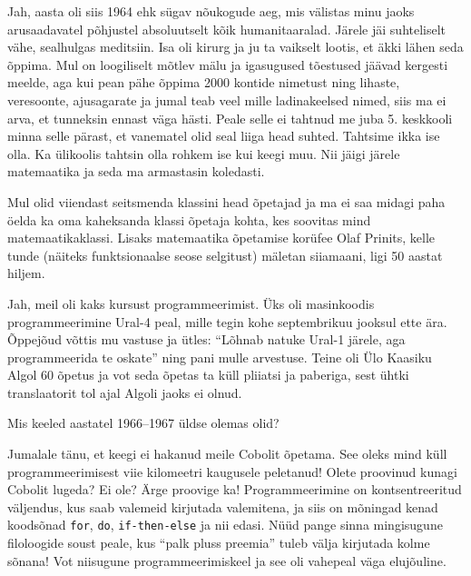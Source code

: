 
Jah, aasta oli siis 1964 ehk sügav nõukogude aeg, mis välistas minu jaoks arusaadavatel 
põhjustel absoluutselt kõik humanitaaralad. Järele jäi suhteliselt vähe, sealhulgas meditsiin. Isa oli kirurg ja ju ta 
vaikselt lootis, et äkki lähen seda õppima. Mul on loogiliselt mõtlev mälu ja 
igasugused tõestused jäävad kergesti meelde, aga kui pean 
pähe õppima 2000 kontide nimetust ning lihaste, veresoonte, 
ajusagarate ja jumal teab veel mille ladinakeelsed nimed, siis ma ei 
arva, et tunneksin ennast väga hästi. Peale selle ei tahtnud me juba 5. keskkooli 
minna selle pärast, et vanematel olid seal liiga head suhted. 
Tahtsime ikka ise olla. Ka ülikoolis tahtsin olla rohkem ise kui keegi muu. 
Nii jäigi järele matemaatika ja seda ma armastasin koledasti. 

Mul olid viiendast seitsmenda klassini head õpetajad ja ma ei saa midagi 
paha öelda ka oma kaheksanda klassi õpetaja kohta, kes soovitas mind matemaatikaklassi. Lisaks matemaatika õpetamise korüfee Olaf 
Prinits, kelle tunde (näiteks funktsionaalse seose selgitust) mäletan siiamaani, ligi 50 aastat hiljem. 


Jah, meil oli kaks kursust programmeerimist. Üks oli masinkoodis 
programmeerimine Ural-4 peal, mille tegin 
kohe septembrikuu jooksul ette ära. Õppejõud võttis mu 
vastuse ja ütles: \enquote{Lõhnab natuke Ural-1 järele, aga programmeerida te 
oskate} ning pani mulle arvestuse. Teine oli Ülo Kaasiku Algol 60 õpetus ja vot seda õpetas ta küll pliiatsi ja 
paberiga, sest ühtki translaatorit tol ajal Algoli jaoks ei olnud. 


Mis keeled aastatel 1966--1967 üldse olemas olid? 

Jumalale tänu, et keegi ei hakanud meile Cobolit õpetama. See 
oleks mind küll programmeerimisest viie kilomeetri kaugusele peletanud! Olete 
proovinud kunagi Cobolit lugeda? Ei ole? Ärge proovige ka! Programmeerimine 
on kontsentreeritud väljendus, kus saab valemeid kirjutada valemitena, ja 
siis on mõningad kenad koodsõnad \verb|for|, \verb|do|, 
\verb|if-then-else| ja nii edasi. Nüüd pange sinna mingisugune filoloogide 
soust peale, kus \enquote{palk pluss preemia} tuleb välja kirjutada kolme 
sõnana! Vot niisugune programmeerimiskeel ja see oli vahepeal väga elujõuline.

